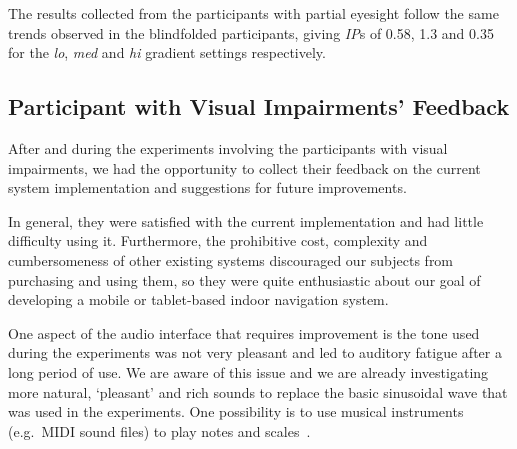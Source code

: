 \documentclass[sigconf, review=true, screen=true, anonymous=true]{acmart}
\begin{document}


The results collected from the participants with partial eyesight follow the same trends observed in the blindfolded participants, giving \emph{IP}s of 0.58, 1.3 and 0.35 for the \emph{lo}, \emph{med} and \emph{hi} gradient settings respectively.  

\subsection{Participant with Visual Impairments' Feedback}

After and during the experiments involving the participants with visual impairments, we had the opportunity to collect their feedback on the current system implementation and suggestions for future improvements.

In general, they were satisfied with the current implementation and had little difficulty using it. Furthermore, the prohibitive cost, complexity and cumbersomeness of other existing systems discouraged our subjects from purchasing and using them, so they were quite enthusiastic about our goal of developing a mobile or tablet-based indoor navigation system. 

One aspect of the audio interface that requires improvement is the tone used during the experiments was not very pleasant and led to auditory fatigue after a long period of use. We are aware of this issue and we are already investigating more natural, `pleasant' and rich sounds to replace the basic sinusoidal wave that was used in the experiments. One possibility is to use musical instruments (e.g.\ MIDI sound files) to play notes and scales~\cite{brewster1998using}.
\end{document}

